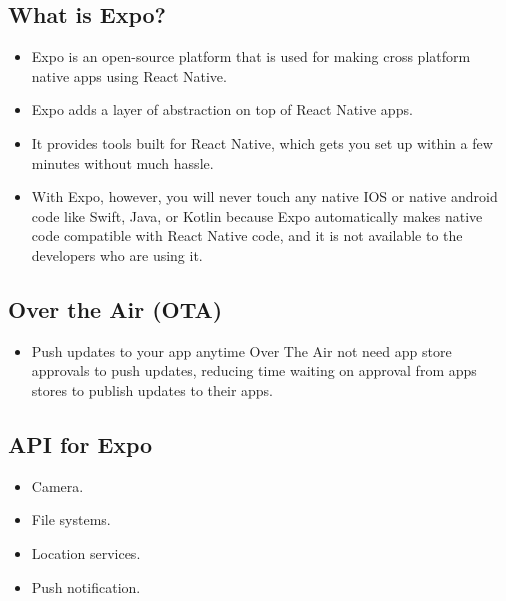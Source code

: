 \subsection{What is Expo?}
\begin{itemize}
    \item Expo is an open-source platform that is used for making cross platform native apps using React Native.
    \item Expo adds a layer of abstraction on top of React Native apps. 
    \item It provides tools built for React Native, which gets you set up within a few minutes without much hassle.
    \item With Expo, however, you will never touch any native IOS or native android code like Swift, Java, or Kotlin because Expo automatically makes native code compatible with React Native code, and it is not available to the developers who are using it.
\end{itemize}

\subsection{Over the Air (OTA)}
\begin{itemize}
    \item Push updates to your app anytime Over The Air not need app store approvals to push updates, reducing time waiting on approval from apps stores to publish updates to their apps.
\end{itemize}

\subsection{API for Expo}
\begin{itemize}
    \item Camera.
    \item File systems.
    \item Location services.
    \item Push notification.
\end{itemize}

